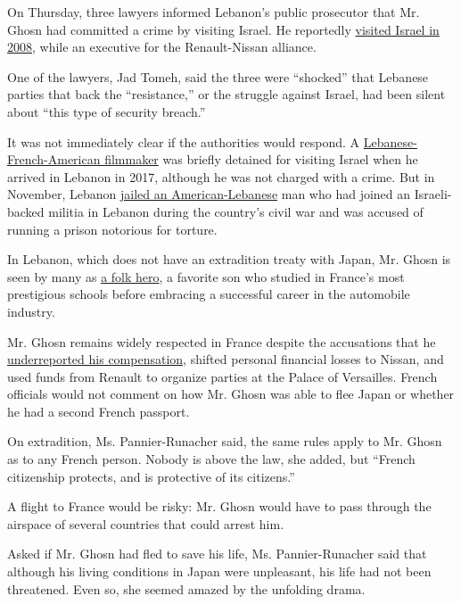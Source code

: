 On Thursday, three lawyers informed Lebanon's public prosecutor that Mr.
Ghosn had committed a crime by visiting Israel. He reportedly
\href{https://www.timesofisrael.com/lebanese-lawyers-want-ex-chief-of-nissan-prosecuted-over-2008-israel-trip/}{visited
Israel in 2008}, while an executive for the Renault-Nissan alliance.

One of the lawyers, Jad Tomeh, said the three were ``shocked'' that
Lebanese parties that back the ``resistance,'' or the struggle against
Israel, had been silent about ``this type of security breach.''

It was not immediately clear if the authorities would respond. A
\href{https://www.nytimes.com/2017/09/22/world/middleeast/lebanon-director-treason.html}{Lebanese-French-American
filmmaker} was briefly detained for visiting Israel when he arrived in
Lebanon in 2017, although he was not charged with a crime. But in
November, Lebanon
\href{https://www.timesofisrael.com/us-citizen-jailed-in-lebanon-20-years-after-fleeing-with-israel-allied-militia/}{jailed
an American-Lebanese} man who had joined an Israeli-backed militia in
Lebanon during the country's civil war and was accused of running a
prison notorious for torture.

In Lebanon, which does not have an extradition treaty with Japan, Mr.
Ghosn is seen by many as
\href{https://www.nytimes.com/2019/12/31/business/carlos-ghosn-lebanon.html}{a
folk hero}, a favorite son who studied in France's most prestigious
schools before embracing a successful career in the automobile industry.

Mr. Ghosn remains widely respected in France despite the accusations
that he
\href{https://www.nytimes.com/2019/03/06/business/carlos-ghosn-nissan.html}{underreported
his compensation}, shifted personal financial losses to Nissan, and used
funds from Renault to organize parties at the Palace of Versailles.
French officials would not comment on how Mr. Ghosn was able to flee
Japan or whether he had a second French passport.

On extradition, Ms. Pannier-Runacher said, the same rules apply to Mr.
Ghosn as to any French person. Nobody is above the law, she added, but
``French citizenship protects, and is protective of its citizens.''

A flight to France would be risky: Mr. Ghosn would have to pass through
the airspace of several countries that could arrest him.

Asked if Mr. Ghosn had fled to save his life, Ms. Pannier-Runacher said
that although his living conditions in Japan were unpleasant, his life
had not been threatened. Even so, she seemed amazed by the unfolding
drama.

